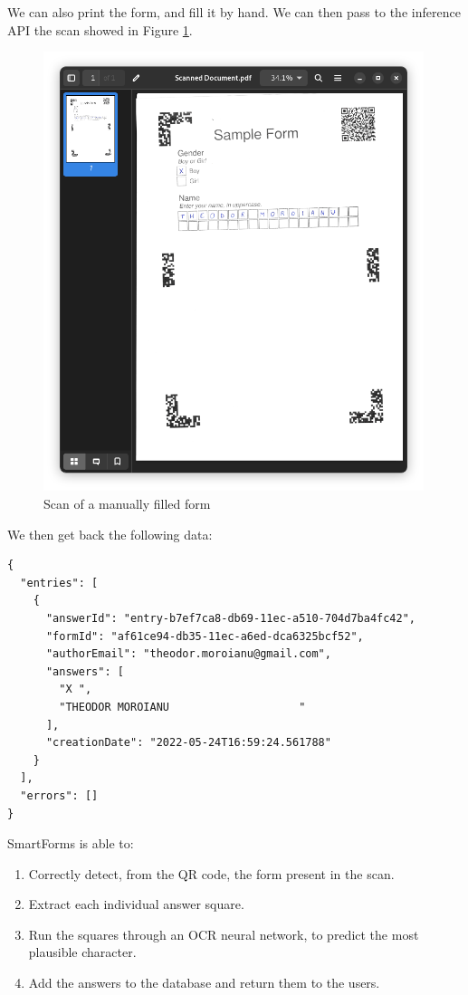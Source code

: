 \documentclass[11pt, a4paper]{report}
\begin{document}
We can also print the form, and fill it by hand. We can then pass to the inference API the scan showed in Figure \ref{scan-of-filled-form}.

\begin{figure}[!h]
    \centering
    \includegraphics[width=30em]{images/screenshoots/sample_form_scan.png}
    \caption{Scan of a manually filled form}
    \label{scan-of-filled-form}
\end{figure}


We then get back the following data:

\begin{verbatim}
{
  "entries": [
    {
      "answerId": "entry-b7ef7ca8-db69-11ec-a510-704d7ba4fc42",
      "formId": "af61ce94-db35-11ec-a6ed-dca6325bcf52",
      "authorEmail": "theodor.moroianu@gmail.com",
      "answers": [
        "X ",
        "THEODOR MOROIANU                    "
      ],
      "creationDate": "2022-05-24T16:59:24.561788"
    }
  ],
  "errors": []
}
\end{verbatim}

SmartForms is able to:
\begin{enumerate}
    \item Correctly detect, from the QR code, the form present in the scan.
    \item Extract each individual answer square.
    \item Run the squares through an OCR neural network, to predict the most plausible character.
    \item Add the answers to the database and return them to the users.
\end{enumerate}
\end{document}
